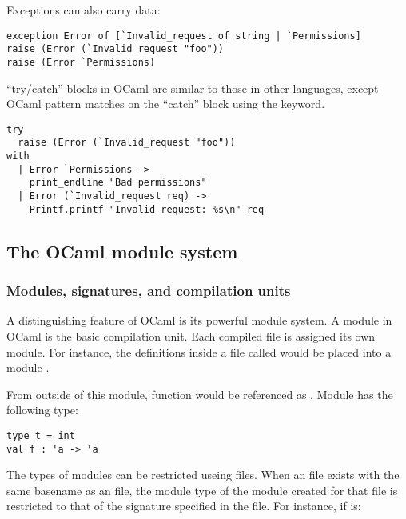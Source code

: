 Exceptions can also carry data:

\begin{lstlisting}
exception Error of [`Invalid_request of string | `Permissions]
raise (Error (`Invalid_request "foo"))
raise (Error `Permissions)
\end{lstlisting}

``try/catch'' blocks in OCaml are similar to those in other languages,
except OCaml pattern matches on the ``catch'' block using the
 keyword.

\begin{lstlisting}
try
  raise (Error (`Invalid_request "foo"))
with
  | Error `Permissions ->
    print_endline "Bad permissions"
  | Error (`Invalid_request req) ->
    Printf.printf "Invalid request: %s\n" req
\end{lstlisting}

\subsection{The OCaml module system}

\subsubsection{Modules, signatures, and compilation units}

A distinguishing feature of OCaml is its powerful module system. A
module in OCaml is the basic compilation unit. Each compiled file is
assigned its own module. For instance, the definitions inside a file
called  would be placed into a module .



From outside of this module, function  would be referenced as
. Module  has the following type:

\begin{lstlisting}
type t = int
val f : 'a -> 'a
\end{lstlisting}

The types of modules can be restricted useing  files. When
an  file exists with the same basename as an  file,
the module type of the module created for that  file is
restricted to that of the signature specified in the 
file. For instance, if  is:

